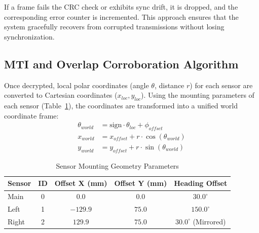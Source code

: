 \documentclass[conference]{IEEEtran}
\begin{document}
If a frame fails the CRC check or exhibits sync drift, it is dropped, and the corresponding error counter is incremented. This approach ensures that the system gracefully recovers from corrupted transmissions without losing synchronization.

\subsection{MTI and Overlap Corroboration Algorithm}
\label{subsec:mti}
Once decrypted, local polar coordinates (angle $\theta$, distance $r$) for each sensor are converted to Cartesian coordinates ($x_{loc}, y_{loc}$). Using the mounting parameters of each sensor (Table~\ref{tab:geometry}), the coordinates are transformed into a unified world coordinate frame:
\begin{align}
    \theta_{world} &= \text{sign} \cdot \theta_{loc} + \phi_{offset} \label{eq:theta_world}\\
    x_{world} &= x_{offset} + r \cdot \cos(\theta_{world}) \label{eq:x_world}\\
    y_{world} &= y_{offset} + r \cdot \sin(\theta_{world}) \label{eq:y_world}
\end{align}

\begin{table}[htbp]
\caption{Sensor Mounting Geometry Parameters}
\begin{center}
\begin{tabular}{lcccc}
\toprule
\textbf{Sensor} & \textbf{ID} & \textbf{Offset X (mm)} & \textbf{Offset Y (mm)} & \textbf{Heading Offset} \\
\midrule
Main  & 0 & 0.0 & 0.0 & $30.0^\circ$ \\
Left  & 1 & $-129.9$ & $75.0$ & $150.0^\circ$ \\
Right & 2 & $129.9$ & $75.0$ & $30.0^\circ$ (Mirrored) \\
\bottomrule
\end{tabular}
\label{tab:geometry}
\end{center}
\end{table}
\end{document}
